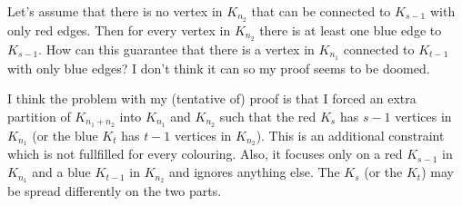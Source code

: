 Let's assume that there is no vertex in $K_{n_2}$ that can be connected to $K_{s-1}$ with only red edges.
Then for every vertex in $K_{n_2}$ there is at least one blue edge to $K_{s-1}$.
How can this guarantee that there is a vertex in $K_{n_1}$ connected to $K_{t-1}$ with only blue edges?
I don't think it can so my proof seems to be doomed.

I think the problem with my (tentative of) proof is that I forced an extra partition of $K_{n_1+n_2}$ into $K_{n_1}$ and $K_{n_2}$
such that the red $K_s$ has $s-1$ vertices in $K_{n_1}$ (or the blue $K_t$ has $t-1$ vertices in $K_{n_2}$).
This is an additional constraint which is not fullfilled for every colouring.
Also, it focuses only on a red $K_{s-1}$ in $K_{n_1}$ and a blue $K_{t-1}$ in $K_{n_2}$ and ignores anything else.
The $K_s$ (or the $K_t$) may be spread differently on the two parts.